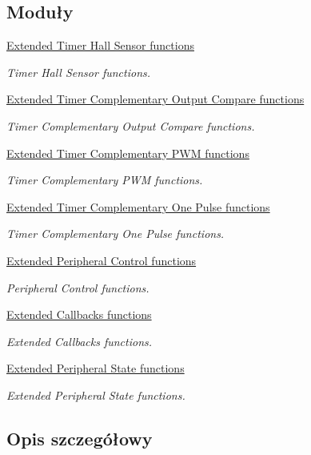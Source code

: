 \subsection*{Moduły}
\begin{DoxyCompactItemize}
\item 
\hyperlink{group___t_i_m_ex___exported___functions___group1}{Extended Timer Hall Sensor functions}
\begin{DoxyCompactList}\small\item\em Timer Hall Sensor functions. \end{DoxyCompactList}\item 
\hyperlink{group___t_i_m_ex___exported___functions___group2}{Extended Timer Complementary Output Compare functions}
\begin{DoxyCompactList}\small\item\em Timer Complementary Output Compare functions. \end{DoxyCompactList}\item 
\hyperlink{group___t_i_m_ex___exported___functions___group3}{Extended Timer Complementary P\+W\+M functions}
\begin{DoxyCompactList}\small\item\em Timer Complementary P\+WM functions. \end{DoxyCompactList}\item 
\hyperlink{group___t_i_m_ex___exported___functions___group4}{Extended Timer Complementary One Pulse functions}
\begin{DoxyCompactList}\small\item\em Timer Complementary One Pulse functions. \end{DoxyCompactList}\item 
\hyperlink{group___t_i_m_ex___exported___functions___group5}{Extended Peripheral Control functions}
\begin{DoxyCompactList}\small\item\em Peripheral Control functions. \end{DoxyCompactList}\item 
\hyperlink{group___t_i_m_ex___exported___functions___group6}{Extended Callbacks functions}
\begin{DoxyCompactList}\small\item\em Extended Callbacks functions. \end{DoxyCompactList}\item 
\hyperlink{group___t_i_m_ex___exported___functions___group7}{Extended Peripheral State functions}
\begin{DoxyCompactList}\small\item\em Extended Peripheral State functions. \end{DoxyCompactList}\end{DoxyCompactItemize}


\subsection{Opis szczegółowy}
